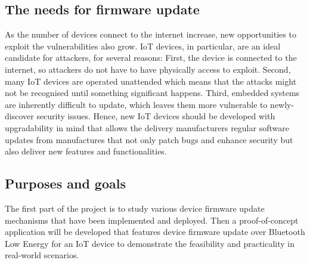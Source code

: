 \subsection{The needs for firmware update}
\justify
As the number of devices connect to the internet increase, new opportunities 
to exploit the vulnerabilities also grow. IoT devices, in particular, are 
an ideal candidate for attackers, for several reasons: First, the device 
is connected to the internet, so attackers do not have to have physically 
access to exploit. Second, many IoT devices are operated unattended which 
means that the attacks might not be recognised until something significant 
happens. Third, embedded systems are inherently difficult to update, which 
leaves them more vulnerable to newly-discover security issues.  Hence, 
new IoT devices should be developed with upgradability in mind that allows 
the delivery manufacturers regular software updates from manufactures that 
not only patch bugs and enhance security but also deliver new features 
and functionalities.

\subsection{Purposes and goals}
\justify
The first part of the project is to study various device firmware update 
mechanisms that have been implemented and deployed. Then a proof-of-concept 
application will be developed that features device firmware update over 
Bluetooth Low Energy for an IoT device to demonstrate the feasibility and 
practicality in real-world scenarios.  